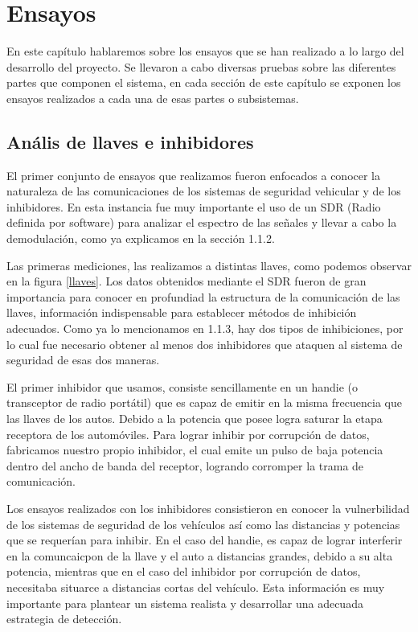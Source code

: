 \chapter{Ensayos}

En este capítulo hablaremos sobre los ensayos que se han realizado a lo largo del desarrollo del proyecto. Se llevaron a cabo diversas pruebas
sobre las diferentes partes que componen el sistema, en cada sección de este capítulo se exponen los ensayos realizados a cada una de esas partes
o subsistemas.

\section {Anális de llaves e inhibidores} 

El primer conjunto de ensayos que realizamos fueron enfocados a conocer la naturaleza de las comunicaciones de los sistemas de seguridad vehicular
y de los inhibidores. En esta instancia fue muy importante el uso de un SDR (Radio definida por software) para analizar el espectro de las señales y
llevar a cabo la demodulación, como ya explicamos en la sección 1.1.2. \par 
Las primeras mediciones, las realizamos a distintas llaves, como podemos observar en la figura \ref{llaves}. Los datos obtenidos mediante el SDR
fueron de gran importancia para conocer en profundiad la estructura de la comunicación de las llaves, información indispensable para establecer 
métodos de inhibición adecuados.
Como ya lo mencionamos en 1.1.3, hay dos tipos de inhibiciones, por lo cual fue necesario obtener al menos dos inhibidores que ataquen al sistema 
de seguridad de esas dos maneras. \par
El primer inhibidor que usamos, consiste sencillamente en un handie (o transceptor de radio portátil) que es capaz
de emitir en la misma frecuencia que las llaves de los autos. Debido a la potencia que posee logra saturar la etapa receptora de los automóviles.
Para lograr inhibir por corrupción de datos, fabricamos nuestro propio inhibidor, el cual emite un pulso de baja potencia dentro del ancho de banda
del receptor, logrando corromper la trama de comunicación.\par 

Los ensayos realizados con los inhibidores consistieron en conocer la vulnerbilidad de los sistemas de seguridad de los vehículos así como las
distancias y potencias que se requerían para inhibir. En el caso del handie, es capaz de lograr interferir en la comuncaicpon de la llave y el auto a
distancias grandes, debido a su alta potencia, mientras que en el caso del inhibidor por corrupción de datos, necesitaba situarce a distancias
cortas del vehículo. Esta información es muy importante para plantear un sistema realista y desarrollar una adecuada estrategia de detección.

